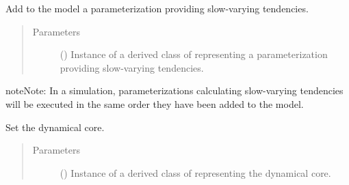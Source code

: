 \documentclass[letterpaper,10pt,english]{sphinxmanual}
\begin{document}
\begin{fulllineitems}
\begin{fulllineitems}
\end{fulllineitems}


\begin{fulllineitems}
\label{\detokenize{api:model.Model.add_slow_tendency_parameterization}}
Add to the model a parameterization providing slow-varying tendencies.
\begin{quote}\begin{description}
\item[{Parameters}] \leavevmode
{} () \textendash{} Instance of a derived class of 
representing a parameterization providing slow-varying tendencies.

\end{description}\end{quote}

\begin{sphinxadmonition}{note}{Note:}
In a simulation, parameterizations calculating slow-varying tendencies will be executed in the same
order they have been added to the model.
\end{sphinxadmonition}

\end{fulllineitems}


\begin{fulllineitems}
\label{\detokenize{api:model.Model.set_dynamical_core}}
Set the dynamical core.
\begin{quote}\begin{description}
\item[{Parameters}] \leavevmode
{} () \textendash{} Instance of a derived class of 
representing the dynamical core.

\end{description}\end{quote}

\end{fulllineitems}


\end{fulllineitems}
\end{document}
